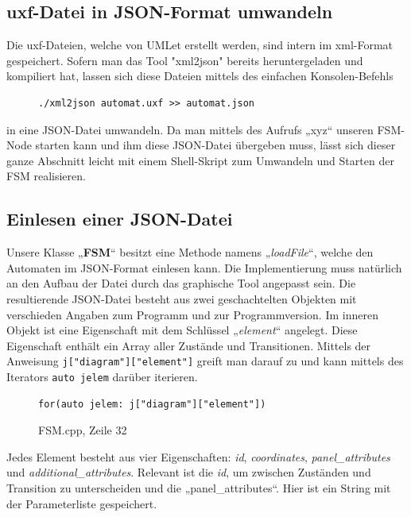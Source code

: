 \subsection{uxf-Datei in JSON-Format umwandeln}
Die uxf-Dateien, welche von UMLet erstellt werden, sind intern im xml-Format
gespeichert. Sofern man das Tool "xml2json" bereits heruntergeladen und
kompiliert hat, lassen sich diese Dateien mittels des einfachen Konsolen-Befehls

\begin{figure}[thp]
\begin{lstlisting}[style=json]
./xml2json automat.uxf >> automat.json

\end{lstlisting}
\centering
\end{figure}

in eine JSON-Datei umwandeln.
Da man mittels des Aufrufs „xyz“ unseren FSM-Node starten kann und ihm diese
JSON-Datei übergeben muss, lässt sich dieser ganze Abschnitt leicht mit einem
Shell-Skript zum Umwandeln und Starten der FSM realisieren.


\subsection{Einlesen einer JSON-Datei}
Unsere Klasse „\textbf{FSM}“ besitzt eine Methode namens „\textit{loadFile}“, welche den Automaten
im JSON-Format einlesen kann. Die Implementierung muss natürlich an den Aufbau
der Datei durch das graphische Tool angepasst sein. Die resultierende
JSON-Datei besteht aus zwei geschachtelten Objekten mit verschieden Angaben zum
Programm und zur Programmversion. Im inneren Objekt ist eine Eigenschaft mit dem
Schlüssel „\textit{element}“ angelegt. Diese Eigenschaft enthält ein Array aller Zustände
und Transitionen.
Mittels der Anweisung \texttt{j["diagram"]["{}element"]} greift man
darauf zu und kann mittels des Iterators \texttt{auto jelem} darüber iterieren.

\begin{figure}[thp]
\begin{lstlisting}[style=json]
for(auto jelem: j["diagram"]["element"])

\end{lstlisting}
\centering
\caption{FSM.cpp, Zeile 32}
\end{figure}

Jedes Element besteht aus vier Eigenschaften: \textit{id}, \textit{coordinates},
\textit{panel\_attributes} und \textit{additional\_attributes}. Relevant ist die \textit{id}, um
zwischen Zuständen und Transition zu unterscheiden und die „panel\_attributes“.
Hier ist ein String mit der Parameterliste gespeichert.

